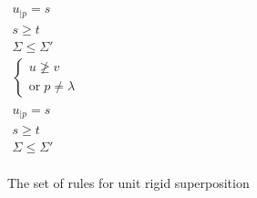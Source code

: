 \begin{figure}[htb]
\begin{center}

    \doubleLine{}
    \DP{} \\[12pt]

    \doubleLine{}
    \DP{} \\[12pt]

    \doubleLine{}
    \DP{}
    $\begin{matrix}
      u_{|p} = s \\
      s \geq t \\
      \Sigma \leq \Sigma'\\
      \left\{ \begin{matrix} u \not\geq v \\ \text{or}\; p \neq \lambda\end{matrix}\right. \\
    \end{matrix}$ \\[12pt]

    \doubleLine{}
    \DP{}
    $\begin{matrix}
      u_{|p} = s \\
      s \geq t \\
      \Sigma \leq \Sigma'\\
    \end{matrix}$

  \caption{The set of rules for unit rigid superposition}
  \label{fig:unit-sup-rules}
  \end{center}
\end{figure}

